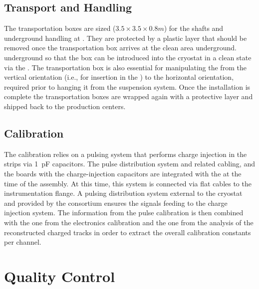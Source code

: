 \subsection{Transport and Handling}
\label{sec:fddp-crp-install-transport}

The transportation boxes are sized ($3.5 \times 3.5 \times 0.8 m$) for the shafts and underground handling at \surf{}.
They are protected by a plastic layer that should be removed once the transportation box arrives at the clean area underground.
underground so that the box can be introduced into the cryostat in a clean state via the . The transportation box is also essential for manipulating the  from the vertical orientation (i.e., for insertion in the ) to the horizontal orientation, required %
 prior to hanging it from the suspension system. Once the installation is complete the transportation boxes are wrapped again with a protective layer and shipped back to the production centers. 

\subsection{Calibration}
\label{sec:fddp-crp-install-calib}

The  calibration relies on a pulsing system that performs charge injection in the strips via \SI{1}{pF} capacitors. The pulse distribution system and related cabling, and the boards with the charge-injection capacitors are integrated  with the  at the time of the  assembly. At this time, this system is connected via flat cables to the instrumentation flange. A pulsing distribution system external to the cryostat and  provided by the  consortium ensures the signals feeding to the charge injection system. 
The information from the pulse calibration is then combined
with the one from the  electronics calibration and the one from the analysis of the reconstructed charged tracks in order to extract the overall calibration constants per channel.

\section{Quality Control}
\label{sec:fddp-crp-qc}

